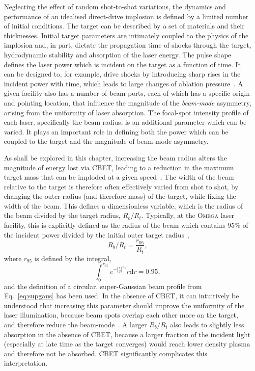 Neglecting the effect of random shot-to-shot variations, the dynamics and performance of an idealised direct-drive implosion is defined by a limited number of initial conditions.
The target can be described by a set of materials and their thicknesses.
Initial target parameters are intimately coupled to the physics of the implosion and, in part, dictate the propagation time of shocks through the target, hydrodynamic stability and absorption of the laser energy.
The pulse shape defines the laser power which is incident on the target as a function of time.
It can be designed to, for example, drive shocks by introducing sharp rises in the incident power with time, which leads to large changes of ablation pressure~\cite{scott_shockaugmented_2022}.
A given facility also has a number of beam ports, each of which has a specific origin and pointing location, that influence the magnitude of the \textit{beam-mode} asymmetry, arising from the uniformity of laser absorption.
The focal-spot intensity profile of each laser, specifically the beam radius, is an additional parameter which can be varied.
It plays an important role in defining both the power which can be coupled to the target and the magnitude of beam-mode asymmetry.

As shall be explored in this chapter, increasing the beam radius alters the magnitude of energy lost via \ac{CBET}, leading to a reduction in the maximum target mass that can be imploded at a given speed~\cite{froula_increasing_2012}.
The width of the beam relative to the target is therefore often effectively varied from shot to shot, by changing the outer radius (and therefore mass) of the target, while fixing the width of the beam.
This defines a dimensionless variable, which is the radius of the beam divided by the target radius, $R_b/R_t$.
Typically, at the \textsc{Omega} laser facility, this is explicitly defined as the radius of the beam which contains 95\% of the incident power divided by the initial outer target radius~\cite{froula_increasing_2012,colaitis_exploration_2023,anderson_enhanced_2024},
\begin{equation}
    R_b/R_t = \frac{r_{95}}{R_t},
\end{equation}
where $r_{95}$ is defined by the integral,
\begin{equation}
    \label{eq:Res1_r95}
    \int_0^{r_{95}}e^{- \left| \frac{r}{\sigma} \right| ^{n_s}}r\text{d}r = 0.95,
\end{equation}
and the definition of a circular, super-Gaussian beam profile from Eq.~\ref{eq:supgaus} has been used.
In the absence of \ac{CBET}, it can intuitively be understood that increasing this parameter should improve the uniformity of the laser illumination, because beam spots overlap each other more on the target, and therefore reduce the beam-mode~\cite{lees_understanding_2023}.
A larger $R_b/R_t$ also leads to slightly less absorption in the absence of \ac{CBET}, because a larger fraction of the incident light (especially at late time as the target converges) would reach lower density plasma and therefore not be absorbed.
\ac{CBET} significantly complicates this interpretation.


